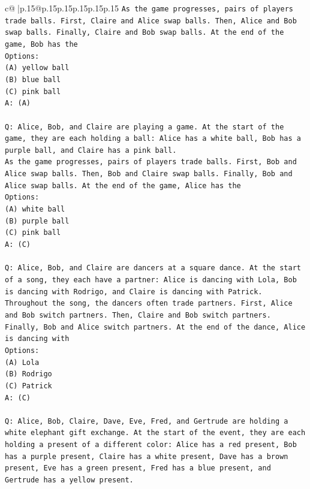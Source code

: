 \documentclass{article}
\begin{document}
{\begin{supertabular}{c@{$\;$}|p{.15\linewidth}@{}p{.15\linewidth}p{.15\linewidth}p{.15\linewidth}p{.15\linewidth}p{.15\linewidth}}
{{{\texttt{As the game progresses, pairs of players trade balls. First, Claire and Alice swap balls. Then, Alice and Bob swap balls. Finally, Claire and Bob swap balls. At the end of the game, Bob has the} \\
\texttt{Options:} \\
\texttt{(A) yellow ball} \\
\texttt{(B) blue ball} \\
\texttt{(C) pink ball} \\
\texttt{A: (A)} \\
\\ 
\texttt{Q: Alice, Bob, and Claire are playing a game. At the start of the game, they are each holding a ball: Alice has a white ball, Bob has a purple ball, and Claire has a pink ball.} \\
\texttt{As the game progresses, pairs of players trade balls. First, Bob and Alice swap balls. Then, Bob and Claire swap balls. Finally, Bob and Alice swap balls. At the end of the game, Alice has the} \\
\texttt{Options:} \\
\texttt{(A) white ball} \\
\texttt{(B) purple ball} \\
\texttt{(C) pink ball} \\
\texttt{A: (C)} \\
\\ 
\texttt{Q: Alice, Bob, and Claire are dancers at a square dance. At the start of a song, they each have a partner: Alice is dancing with Lola, Bob is dancing with Rodrigo, and Claire is dancing with Patrick.} \\
\texttt{Throughout the song, the dancers often trade partners. First, Alice and Bob switch partners. Then, Claire and Bob switch partners. Finally, Bob and Alice switch partners. At the end of the dance, Alice is dancing with} \\
\texttt{Options:} \\
\texttt{(A) Lola} \\
\texttt{(B) Rodrigo} \\
\texttt{(C) Patrick} \\
\texttt{A: (C)} \\
\\ 
\texttt{Q: Alice, Bob, Claire, Dave, Eve, Fred, and Gertrude are holding a white elephant gift exchange. At the start of the event, they are each holding a present of a different color: Alice has a red present, Bob has a purple present, Claire has a white present, Dave has a brown present, Eve has a green present, Fred has a blue present, and Gertrude has a yellow present.} \\
}}}
\end{supertabular}}
\end{document}
